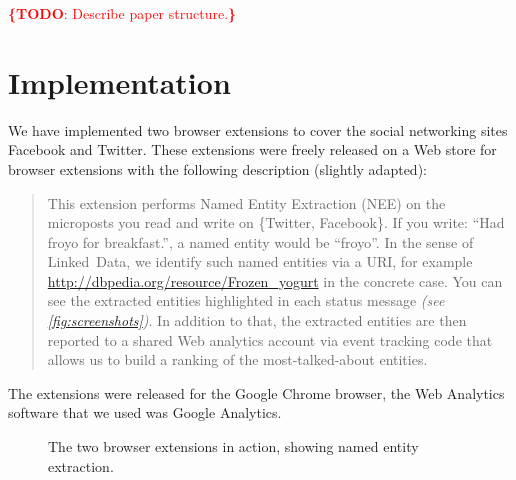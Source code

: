 \documentclass{iosart2c}
\newcommand{\todo}[1]{\noindent\textcolor{red}{{\bf \{TODO}: #1{\bf \}}}}
\begin{document}
\todo{Describe paper structure.}

\section{Implementation} \label{sec:implementation}
We have implemented two browser extensions to cover the social networking sites Facebook and Twitter.
These extensions were freely released on a Web store for browser extensions with the following description (slightly adapted):
\begin{quotation}
This extension performs Named Entity Extraction (NEE) on the microposts you read and write on \{Twitter, Facebook\}.
If you write: ``Had froyo for breakfast.'', a named entity would be ``froyo''.
In the sense of Linked~Data, we identify such named entities via a URI, for example \url{http://dbpedia.org/resource/Frozen_yogurt} in the concrete case.
You can see the extracted entities highlighted in each status message \emph{(see \autoref{fig:screenshots})}.
In addition to that, the extracted entities are then reported to a shared Web analytics account via event tracking code  that allows us to build a ranking of the most-talked-about entities.
\end{quotation}
The extensions were released for the Google Chrome browser, the Web Analytics software that we used was Google Analytics.

\begin{figure}
  \centering
    \qquad
\caption{The two browser extensions in action, showing named entity extraction.}
\label{fig:screenshots}
\end{figure}
\end{document}
